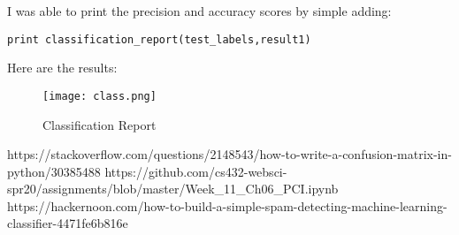 \documentclass[letterpaper,12pt]{article}
\begin{document}
I was able to print the precision and accuracy scores by simple adding:
\begin{verbatim}
print classification_report(test_labels,result1) 
\end{verbatim}

Here are the results: \\

\begin{figure}
\texttt{[image: class.png]}
\caption{Classification Report}
\end{figure}

\vspace{2mm}
\vspace{5mm}
\vspace{5mm}

\newpage
\newpage
\vspace*{5pt}

\begin{thebibliography}{9}
https://stackoverflow.com/questions/2148543/how-to-write-a-confusion-matrix-in-python/30385488
https://github.com/cs432-websci-spr20/assignments/blob/master/Week_11_Ch06_PCI.ipynb
https://hackernoon.com/how-to-build-a-simple-spam-detecting-machine-learning-classifier-4471fe6b816e
\end{thebibliography}
\end{document}
